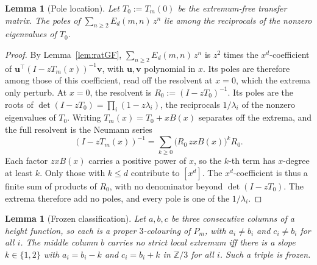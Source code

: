 \documentclass[11pt]{article}
\newtheorem{lemma}[theorem]{Lemma}
\theoremstyle{definition}
\theoremstyle{remark}
\newcommand{\Z}{\mathbb{Z}}
\begin{document}
\begin{lemma}[Pole location]\label{lem:poles}
Let $T_0:=T_m(0)$ be the extremum-free transfer matrix. The poles of
$\sum_{n\ge2} E_d(m,n)\,z^n$ lie among the reciprocals of the nonzero eigenvalues
of $T_0$.
\end{lemma}

\begin{proof}
By Lemma~\ref{lem:ratGF}, $\sum_{n\ge2} E_d(m,n)\,z^n$ is $z^2$ times the $x^d$-coefficient of
$\mathbf u^{\!\top}(I-zT_m(x))^{-1}\mathbf v$, with $\mathbf u,\mathbf v$ polynomial in $x$. Its poles
are therefore among those of this coefficient, read off the resolvent at $x=0$,
which the extrema only perturb. At $x=0$, the resolvent is $R_0:=(I-zT_0)^{-1}$. Its poles are the
roots of $\det(I-zT_0)=\prod_i(1-z\lambda_i)$, the reciprocals $1/\lambda_i$ of the nonzero
eigenvalues of $T_0$. Writing $T_m(x)=T_0+xB(x)$ separates off the extrema, and the full resolvent
is the Neumann series
\[
  (I-zT_m(x))^{-1}=\sum_{k\ge0}\big(R_0\,zxB(x)\big)^k R_0.
\]
Each factor $zxB(x)$ carries a positive power of $x$, so the $k$-th term has $x$-degree at least
$k$. Only those with $k\le d$ contribute to $[x^d]$. The $x^d$-coefficient is thus a finite sum of
products of $R_0$, with no denominator beyond $\det(I-zT_0)$. The extrema therefore add no poles,
and every pole is one of the $1/\lambda_i$.
\end{proof}

\begin{lemma}[Frozen classification]\label{lem:frozen}
Let $a,b,c$ be three consecutive columns of a height function, so each is a proper
$3$-colouring of $P_m$, with $a_i\ne b_i$ and $c_i\ne b_i$ for all $i$. The middle
column $b$ carries no strict local extremum iff there is a slope
$k\in\{1,2\}$ with $a_i=b_i-k$ and $c_i=b_i+k$ in $\Z/3$ for all $i$. Such
a triple is \emph{frozen}.
\end{lemma}
\end{document}
